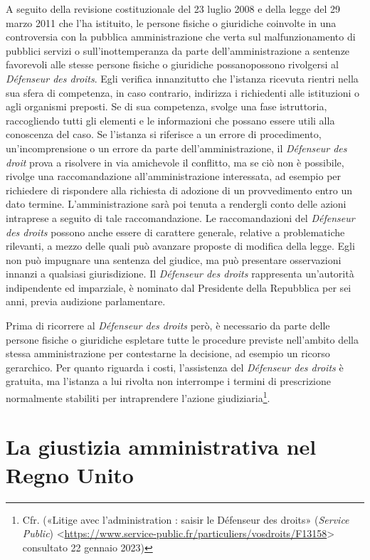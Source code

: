 \documentclass[12pt,it,a4paper,]{report}
\begin{document}
A seguito della revisione costituzionale del 23 luglio 2008 e della
legge del 29 marzo 2011 che l'ha istituito, le persone fisiche o
giuridiche coinvolte in una controversia con la pubblica amministrazione
che verta sul malfunzionamento di pubblici servizi o sull'inottemperanza
da parte dell'amministrazione a sentenze favorevoli alle stesse persone
fisiche o giuridiche possanopossono rivolgersi al \emph{Défenseur des
droits}. Egli verifica innanzitutto che l'istanza ricevuta rientri nella
sua sfera di competenza, in caso contrario, indirizza i richiedenti alle
istituzioni o agli organismi preposti. Se di sua competenza, svolge una
fase istruttoria, raccogliendo tutti gli elementi e le informazioni che
possano essere utili alla conoscenza del caso. Se l'istanza si riferisce
a un errore di procedimento, un'incomprensione o un errore da parte
dell'amministrazione, il \emph{Défenseur des droit} prova a risolvere in
via amichevole il conflitto, ma se ciò non è possibile, rivolge una
raccomandazione all'amministrazione interessata, ad esempio per
richiedere di rispondere alla richiesta di adozione di un provvedimento
entro un dato termine. L'amministrazione sarà poi tenuta a rendergli
conto delle azioni intraprese a seguito di tale raccomandazione. Le
raccomandazioni del \emph{Défenseur des droits} possono anche essere di
carattere generale, relative a problematiche rilevanti, a mezzo delle
quali può avanzare proposte di modifica della legge. Egli non può
impugnare una sentenza del giudice, ma può presentare osservazioni
innanzi a qualsiasi giurisdizione. Il \emph{Défenseur des droits}
rappresenta un'autorità indipendente ed imparziale, è nominato dal
Presidente della Repubblica per sei anni, previa audizione parlamentare.

Prima di ricorrere al \emph{Défenseur des droits} però, è necessario da
parte delle persone fisiche o giuridiche espletare tutte le procedure
previste nell'ambito della stessa amministrazione per contestarne la
decisione, ad esempio un ricorso gerarchico. Per quanto riguarda i
costi, l'assistenza del \emph{Défenseur des droits} è gratuita, ma
l'istanza a lui rivolta non interrompe i termini di prescrizione
normalmente stabiliti per intraprendere l'azione giudiziaria\footnote{Cfr.
  ({«Litige avec l'administration : saisir le Défenseur des droits»}
  (\emph{Service Public})
  \textless{}\url{https://www.service-public.fr/particuliers/vosdroits/F13158}\textgreater{}
  consultato 22 gennaio 2023)}.

\hypertarget{la-giustizia-amministrativa-nel-regno-unito}{%
\chapter{La giustizia amministrativa nel Regno
Unito}\label{la-giustizia-amministrativa-nel-regno-unito}}
\end{document}
